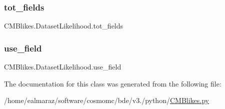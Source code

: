 \subsubsection{\texorpdfstring{tot\+\_\+fields}{tot\_fields}}
{\footnotesize\ttfamily C\+M\+Blikes.\+Dataset\+Likelihood.\+tot\+\_\+fields}

\mbox{\label{classCMBlikes_1_1DatasetLikelihood_a16ee80f3573ff08b64af34dfc3f8203a}} 
\subsubsection{\texorpdfstring{use\+\_\+field}{use\_field}}
{\footnotesize\ttfamily C\+M\+Blikes.\+Dataset\+Likelihood.\+use\+\_\+field}



The documentation for this class was generated from the following file\+:\begin{DoxyCompactItemize}
\item 
/home/ealmaraz/software/cosmomc/bde/v3./python/\mbox{\hyperlink{CMBlikes_8py}{C\+M\+Blikes.\+py}}\end{DoxyCompactItemize}
